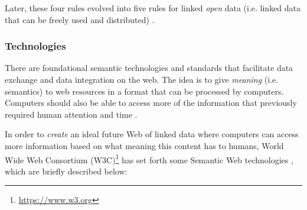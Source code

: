 \documentclass{article}
\begin{document}
Later, these four rules evolved into five rules for linked \emph{open} data (i.e. linked data that can be freely used and distributed) \cite{noauthor_5_nodate}.  

\subsubsection{Technologies}\label{subsubsec:Technologies}
There are foundational semantic technologies and standards that facilitate data exchange and data integration on the web. The idea is to give \emph{meaning} (i.e. semantics) to web resources in a format that can be processed by computers. Computers should also be able to access more of the information that previously required human attention and time \cite{hitzler_foundations_2009}.

In order to \emph{create} an ideal future Web of linked data where computers can access more information based on what meaning this content has to humans, World Wide Web Consortium (W3C)\footnote{\url{https://www.w3.org}} has set forth some Semantic Web technologies \cite{noauthor_semantic_nodate-1}, which are briefly described below:
\end{document}
